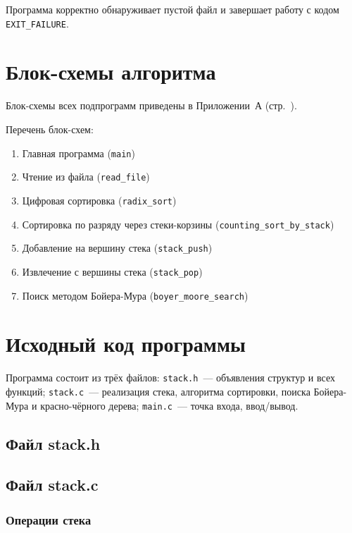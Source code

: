 \documentclass[a4paper,14pt]{extarticle}
\begin{document}
Программа корректно обнаруживает пустой файл и завершает работу с кодом \texttt{EXIT\_FAILURE}.

\newpage
\section{Блок-схемы алгоритма}

Блок-схемы всех подпрограмм приведены в Приложении~А (стр.~\pageref{sec:appendix}).

Перечень блок-схем:
\begin{enumerate}
  \item Главная программа (\texttt{main})
  \item Чтение из файла (\texttt{read\_file})
  \item Цифровая сортировка (\texttt{radix\_sort})
  \item Сортировка по разряду через стеки-корзины (\texttt{counting\_sort\_by\_stack})
  \item Добавление на вершину стека (\texttt{stack\_push})
  \item Извлечение с вершины стека (\texttt{stack\_pop})
  \item Поиск методом Бойера-Мура (\texttt{boyer\_moore\_search})
\end{enumerate}

\newpage
\section{Исходный код программы}

Программа состоит из трёх файлов: \texttt{stack.h}~--- объявления структур и всех функций; \texttt{stack.c}~--- реализация стека, алгоритма сортировки, поиска Бойера-Мура и красно-чёрного дерева; \texttt{main.c}~--- точка входа, ввод/вывод.

\subsection{Файл stack.h}



\subsection{Файл stack.c}

\subsubsection*{Операции стека}
\end{document}

